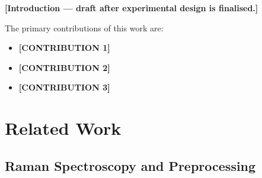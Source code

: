 \documentclass[runningheads]{llncs}
\begin{document}
%
%
%

\textbf{[Introduction — draft after experimental design is finalised.]}

The primary contributions of this work are:
\begin{itemize}
  \item \textbf{[CONTRIBUTION 1]} %
  \item \textbf{[CONTRIBUTION 2]} %
  \item \textbf{[CONTRIBUTION 3]} %
\end{itemize}

\section{Related Work}

\subsection{Raman Spectroscopy and Preprocessing}
\end{document}
